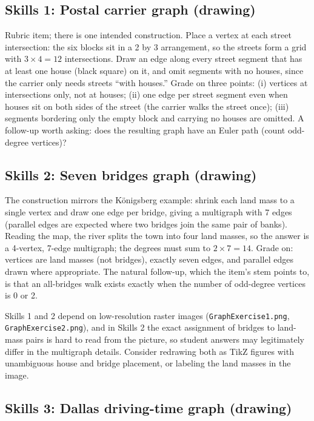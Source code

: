 \subsection*{Skills 1: Postal carrier graph (drawing)}

Rubric item; there is one intended construction. Place a vertex at each street intersection: the six blocks sit in a 2 by 3 arrangement, so the streets form a grid with $3 \times 4 = 12$ intersections. Draw an edge along every street segment that has at least one house (black square) on it, and omit segments with no houses, since the carrier only needs streets ``with houses.'' Grade on three points: (i) vertices at intersections only, not at houses; (ii) one edge per street segment even when houses sit on both sides of the street (the carrier walks the street once); (iii) segments bordering only the empty block and carrying no houses are omitted. A follow-up worth asking: does the resulting graph have an Euler path (count odd-degree vertices)?

\subsection*{Skills 2: Seven bridges graph (drawing)}

The construction mirrors the K\"onigsberg example: shrink each land mass to a single vertex and draw one edge per bridge, giving a multigraph with 7 edges (parallel edges are expected where two bridges join the same pair of banks). Reading the map, the river splits the town into four land masses, so the answer is a 4-vertex, 7-edge multigraph; the degrees must sum to $2 \times 7 = 14$. Grade on: vertices are land masses (not bridges), exactly seven edges, and parallel edges drawn where appropriate. The natural follow-up, which the item's stem points to, is that an all-bridges walk exists exactly when the number of odd-degree vertices is 0 or 2.

\begin{qaflag}
Skills 1 and 2 depend on low-resolution raster images (\texttt{GraphExercise1.png}, \texttt{GraphExercise2.png}), and in Skills 2 the exact assignment of bridges to land-mass pairs is hard to read from the picture, so student answers may legitimately differ in the multigraph details. Consider redrawing both as TikZ figures with unambiguous house and bridge placement, or labeling the land masses in the image.
\end{qaflag}

\subsection*{Skills 3: Dallas driving-time graph (drawing)}

